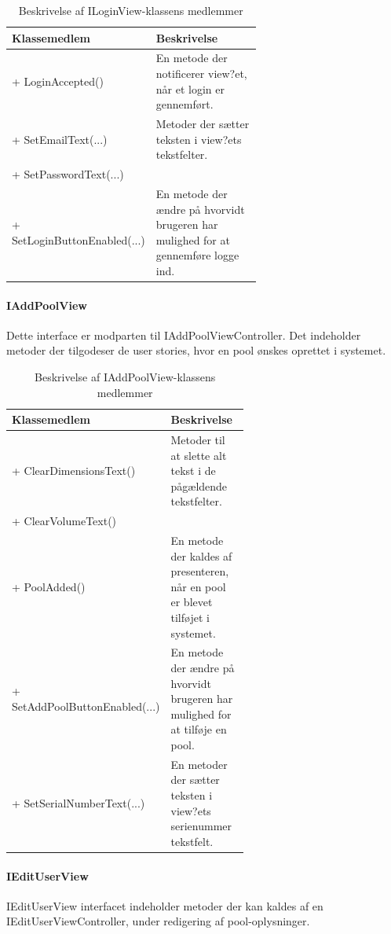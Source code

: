 \begin{table}
	\centering
	\begin{tabular}{| l | p{0.63\linewidth} |}
		\toprule
		\textbf{Klassemedlem}	& \textbf{Beskrivelse} \\
		\midrule
		+ LoginAccepted()				& En metode der notificerer view?et, når et login er gennemført.
	\\\hline
		+ SetEmailText(...)				& Metoder der sætter teksten i view?ets tekstfelter. \\
		+ SetPasswordText(...)				& \\\hline
		+ SetLoginButtonEnabled(...) 					& En metode der ændre på hvorvidt brugeren har mulighed for at gennemføre logge ind. \\
		\bottomrule
		\end{tabular}
	\caption{Beskrivelse af ILoginView-klassens medlemmer}
	\label{tab:table_design_iloginview}	
\end{table}

\paragraph{IAddPoolView}
Dette interface er modparten til IAddPoolViewController. Det indeholder metoder der tilgodeser de user stories, hvor en pool ønskes oprettet i systemet.

\begin{table}
	\centering
	\begin{tabular}{| l | p{0.6\linewidth} |}
		\toprule
		\textbf{Klassemedlem}	& \textbf{Beskrivelse} \\
		\midrule
		+ ClearDimensionsText()				& Metoder til at slette alt tekst i de pågældende tekstfelter. \\
		+ ClearVolumeText()					& \\\hline
		+ PoolAdded()				& En metode der kaldes af presenteren, når en pool er blevet tilføjet i systemet. \\\hline
		+ SetAddPoolButtonEnabled(...)				& En metode der ændre på hvorvidt brugeren har mulighed for at tilføje en pool. \\\hline
		+ SetSerialNumberText(...) 					& En metoder der sætter teksten i view?ets serienummer tekstfelt. \\
		\bottomrule
		\end{tabular}
	\caption{Beskrivelse af IAddPoolView-klassens medlemmer}
	\label{tab:table_design_iaddpoolview}	
\end{table}

\paragraph{IEditUserView}
IEditUserView interfacet indeholder metoder der kan kaldes af en IEditUserViewController, under redigering af pool-oplysninger.

